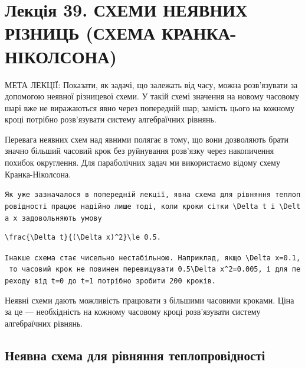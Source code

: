 \documentclass[
  ukrainian,
]{article}
\begin{document}
\section{Лекція 39. СХЕМИ НЕЯВНИХ РІЗНИЦЬ (СХЕМА
КРАНКА-НІКОЛСОНА)}\label{ux43bux435ux43aux446ux456ux44f-39.-ux441ux445ux435ux43cux438-ux43dux435ux44fux432ux43dux438ux445-ux440ux456ux437ux43dux438ux446ux44c-ux441ux445ux435ux43cux430-ux43aux440ux430ux43dux43aux430-ux43dux456ux43aux43eux43bux441ux43eux43dux430}

МЕТА ЛЕКЦІЇ: Показати, як задачі, що залежать від часу, можна
розв'язувати за допомогою неявної різницевої схеми. У такій схемі
значення на новому часовому шарі вже не виражаються явно через
попередній шар; замість цього на кожному кроці потрібно розв'язувати
систему алгебраїчних рівнянь.

Перевага неявних схем над явними полягає в тому, що вони дозволяють
брати значно більший часовий крок без руйнування розв'язку через
накопичення похибок округлення. Для параболічних задач ми використаємо
відому схему Кранка-Ніколсона.

\texttt{Як\ уже\ зазначалося\ в\ попередній\ лекції,\ явна\ схема\ для\ рівняння\ теплопровідності\ працює\ надійно\ лише\ тоді,\ коли\ кроки\ сітки\ \textquotesingle{}\textbackslash{}Delta\ t\textquotesingle{}\ і\ \textquotesingle{}\textbackslash{}Delta\ x\textquotesingle{}\ задовольняють\ умову}

\begin{verbatim}
\frac{\Delta t}{(\Delta x)^2}\le 0.5.
\end{verbatim}

\texttt{Інакше\ схема\ стає\ чисельно\ нестабільною.\ Наприклад,\ якщо\ \textquotesingle{}\textbackslash{}Delta\ x=0.1\textquotesingle{},\ то\ часовий\ крок\ не\ повинен\ перевищувати\ \textquotesingle{}0.5\textbackslash{}Delta\ x\^{}2=0.005\textquotesingle{},\ і\ для\ переходу\ від\ \textquotesingle{}t=0\textquotesingle{}\ до\ \textquotesingle{}t=1\textquotesingle{}\ потрібно\ зробити\ 200\ кроків.}

Неявні схеми дають можливість працювати з більшими часовими кроками.
Ціна за це --- необхідність на кожному часовому кроці розв'язувати
систему алгебраїчних рівнянь.

\subsection{Неявна схема для рівняння
теплопровідності}\label{ux43dux435ux44fux432ux43dux430-ux441ux445ux435ux43cux430-ux434ux43bux44f-ux440ux456ux432ux43dux44fux43dux43dux44f-ux442ux435ux43fux43bux43eux43fux440ux43eux432ux456ux434ux43dux43eux441ux442ux456}
\end{document}
